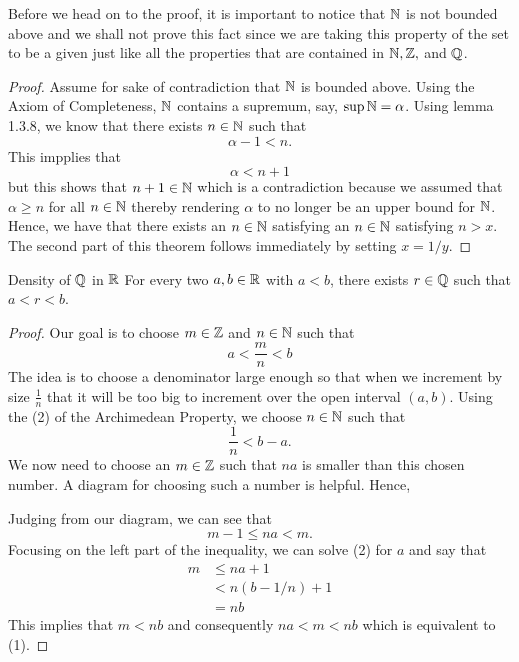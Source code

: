 Before we head on to the proof, it is important to notice that \( \mathbb{N} \) is not bounded above and we shall not prove this fact since we are taking this property of the set to be a given just like all the properties that are contained in \( \mathbb{N}, \mathbb{Z},\)  and \( \mathbb{Q} \). 

\begin{proof}
    Assume for sake of contradiction that \( \mathbb{N} \) is bounded above. Using the Axiom of Completeness, \( \mathbb{N} \) contains a supremum, say, \( \sup \mathbb{N} = \alpha \). Using lemma 1.3.8, we know that there exists \( n \in \mathbb{N} \) such that 
    \[  \alpha - 1 < n \tag{\( \epsilon = 1 \)}.\]
    This impplies that 
    \[ \alpha < n + 1 \]
    but this shows that \( n+1 \in \mathbb{N} \) which is a contradiction because we assumed that \( \alpha \geq n \) for all \( n \in \mathbb{N} \) thereby rendering \( \alpha \) to no longer be an upper bound for \( \mathbb{N} \). Hence, we have that 
    there exists an \( n \in \mathbb{N} \) satisfying an \( n \in \mathbb{N} \) satisfying \( n > x \).
    The second part of this theorem follows immediately by setting \( x = 1/y \).
\end{proof}

\begin{theorem}{Density of \( \mathbb{Q} \) in \( \mathbb{R} \)}{}
        For every two \( a,b \in \mathbb{R} \) with \( a < b \), there exists \( r \in \mathbb{Q} \) such that \( a < r < b \).
    \end{theorem}


\begin{proof}
    Our goal is to choose \( m \in \mathbb{Z} \) and \( n \in \mathbb{N} \) such that 
    \[  a < \frac{ m}{n} < b \tag{1}\]
    The idea is to choose a denominator large enough so that when we increment by size \( \frac{1}{n}\) that it will be too big to increment over the open interval \( (a,b)\). Using the (2) of the Archimedean Property, we choose \( n \in \mathbb{N} \) such that 
    \[ \frac{1}{n} < b - a \tag{2}.\]
    We now need to choose an \( m \in \mathbb{Z} \) such that \( na \) is smaller than this chosen number. A diagram for choosing such a number is helpful. Hence, 

    Judging from our diagram, we can see that 
    \[ m-1 \leq na < m.\]
    Focusing on the left part of the inequality, we can solve (2) for \( a \) and say that 
    \begin{align*}
        m &\leq na + 1  \\ 
            &< n(b - 1/n) + 1 \\ 
            &= nb
    \end{align*} 
    This implies that \( m < nb \) and consequently \( na < m < nb \) which is equivalent to (1). 
    
    
\end{proof}



